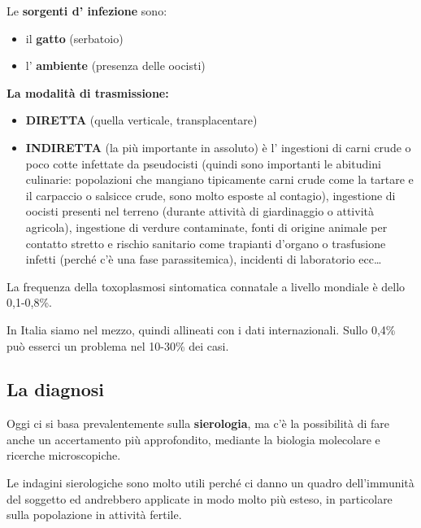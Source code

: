   Le \textbf{sorgenti d' infezione} sono:

\begin{itemize}
\item
  il \textbf{gatto} (serbatoio)
\item
  l' \textbf{ambiente} (presenza delle oocisti)
\end{itemize}
  \textbf{La modalità di trasmissione:}
  \begin{itemize}
\item
  \textbf{DIRETTA} (quella verticale, transplacentare)
\item
  \textbf{INDIRETTA} (la più importante in assoluto) è l' ingestioni di
  carni crude o poco cotte infettate da pseudocisti (quindi sono
  importanti le abitudini culinarie: popolazioni che mangiano
  tipicamente carni crude come la tartare e il carpaccio o salsicce
  crude, sono molto esposte al contagio), ingestione di oocisti presenti
  nel terreno (durante attività di giardinaggio o attività agricola),
  ingestione di verdure contaminate, fonti di origine animale per
  contatto stretto e rischio sanitario come trapianti d'organo o
  trasfusione infetti (perché c'è una fase parassitemica), incidenti di
  laboratorio ecc\ldots{}
  \end{itemize}

  La frequenza della toxoplasmosi sintomatica connatale a livello
  mondiale è dello 0,1-0,8\%.

  In Italia siamo nel mezzo, quindi allineati con i dati internazionali.
  Sullo 0,4\% può esserci un problema nel 10-30\% dei casi.

\subsection{La diagnosi}
  Oggi ci si basa prevalentemente sulla \textbf{sierologia}, ma c'è la
  possibilità di fare anche un accertamento più approfondito, mediante
  la biologia molecolare e ricerche microscopiche.

  Le indagini sierologiche sono molto utili perché ci danno un quadro
  dell'immunità del soggetto ed andrebbero applicate in modo molto più
  esteso, in particolare sulla popolazione in attività fertile.

